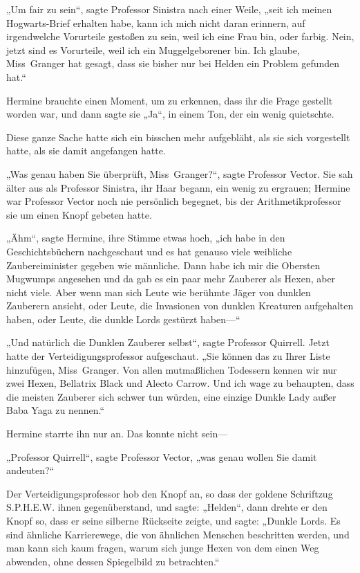 {„Um fair zu sein“, sagte Professor Sinistra nach einer Weile, „seit ich meinen Hogwarts-Brief erhalten habe, kann ich mich nicht daran erinnern, auf irgendwelche Vorurteile gestoßen zu sein, weil ich eine Frau bin, oder farbig. Nein, jetzt sind es Vorurteile, weil ich ein Muggelgeborener bin. Ich glaube, Miss~Granger hat gesagt, dass sie bisher nur bei Helden ein Problem gefunden hat.“

Hermine brauchte einen Moment, um zu erkennen, dass ihr die Frage gestellt worden war, und dann sagte sie „Ja“, in einem Ton, der ein wenig quietschte.

Diese ganze Sache hatte sich ein bisschen mehr aufgebläht, als sie sich vorgestellt hatte, als sie damit angefangen hatte.

„Was genau haben Sie überprüft, Miss~Granger?“, sagte Professor Vector. Sie sah älter aus als Professor Sinistra, ihr Haar begann, ein wenig zu ergrauen; Hermine war Professor Vector noch nie persönlich begegnet, bis der Arithmetikprofessor sie um einen Knopf gebeten hatte.

„Ähm“, sagte Hermine, ihre Stimme etwas hoch, „ich habe in den Geschichtsbüchern nachgeschaut und es hat genauso viele weibliche Zaubereiminister gegeben wie männliche. Dann habe ich mir die Obersten Mugwumps angesehen und da gab es ein paar mehr Zauberer als Hexen, aber nicht viele. Aber wenn man sich Leute wie berühmte Jäger von dunklen Zauberern ansieht, oder Leute, die Invasionen von dunklen Kreaturen aufgehalten haben, oder Leute, die dunkle Lords gestürzt haben—“

„Und natürlich die Dunklen Zauberer selbst“, sagte Professor Quirrell. Jetzt hatte der Verteidigungsprofessor aufgeschaut. „Sie können das zu Ihrer Liste hinzufügen, Miss~Granger. Von allen mutmaßlichen Todessern kennen wir nur zwei Hexen, Bellatrix Black und Alecto Carrow. Und ich wage zu behaupten, dass die meisten Zauberer sich schwer tun würden, eine einzige Dunkle Lady außer Baba Yaga zu nennen.“

Hermine starrte ihn nur an. Das konnte nicht sein—

„Professor Quirrell“, sagte Professor Vector, „was genau wollen Sie damit andeuten?“

Der Verteidigungsprofessor hob den Knopf an, so dass der goldene Schriftzug S.P.H.E.W. ihnen gegenüberstand, und sagte: „Helden“, dann drehte er den Knopf so, dass er seine silberne Rückseite zeigte, und sagte: „Dunkle Lords. Es sind ähnliche Karrierewege, die von ähnlichen Menschen beschritten werden, und man kann sich kaum fragen, warum sich junge Hexen von dem einen Weg abwenden, ohne dessen Spiegelbild zu betrachten.“

}
